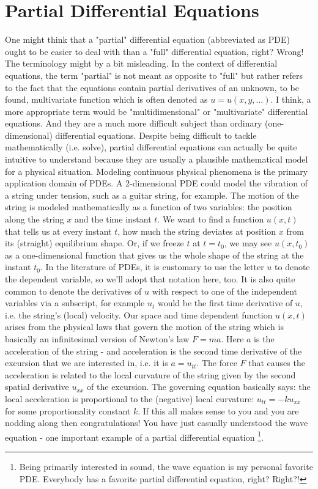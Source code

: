 \section{Partial Differential Equations}
One might think that a "partial" differential equation (abbreviated as PDE) ought to be easier to deal with than a "full" differential equation, right? Wrong! The terminology might by a bit misleading. In the context of differential equations, the term "partial" is not meant as opposite to "full" but rather refers to the fact that the equations contain partial derivatives of an unknown, to be found, multivariate function which is often denoted as $u = u(x,y,\ldots)$. I think, a more appropriate term would be "multidimensional" or "multivariate" differential equations. And they are a much more difficult subject than ordinary (one-dimensional) differential equations. Despite being difficult to tackle mathematically (i.e. solve), partial differential equations can actually be quite intuitive to understand because they are usually a plausible mathematical model for a physical situation. Modeling continuous physical phenomena is the primary application domain of PDEs. A 2-dimensional PDE could model the vibration of a string under tension, such as a guitar string, for example. The motion of the string is modeled mathematically as a function of two variables: the position along the string $x$ and the time instant $t$. We want to find a function $u(x,t)$ that tells us at every instant $t$, how much the string deviates at position $x$ from its (straight) equilibrium shape. Or, if we freeze $t$ at $t = t_0$, we may see $u(x, t_0)$ as a one-dimensional function that gives us the whole shape of the string at the instant $t_0$. In the literature of PDEs, it is customary to use the letter $u$ to denote the dependent variable, so we'll adopt that notation here, too. It is also quite common to denote the derivatives of $u$ with respect to one of the independent variables via a subscript, for example $u_t$ would be the first time derivative of $u$, i.e. the string's (local) velocity. Our space and time dependent function $u(x,t)$ arises from the physical laws that govern the motion of the string which is basically an infinitesimal version of Newton's law $F = m a$. Here $a$ is the acceleration of the string - and acceleration is the second time derivative of the excursion that we are interested in, i.e. it is $a = u_{tt}$. The force $F$ that causes the acceleration is related to the local curvature of the string given by the second spatial derivative $u_{xx}$ of the excursion. The governing equation basically says: the local acceleration is proportional to the (negative) local curvature: $u_{tt} = -k u_{xx}$ for some proportionality constant $k$. If this all makes sense to you and you are nodding along then congratulations! You have just casually understood the wave equation - one important example of a partial differential equation \footnote{Being primarily interested in sound, the wave equation is my personal favorite PDE. Everybody has a favorite partial differential equation, right? Right?!}.



